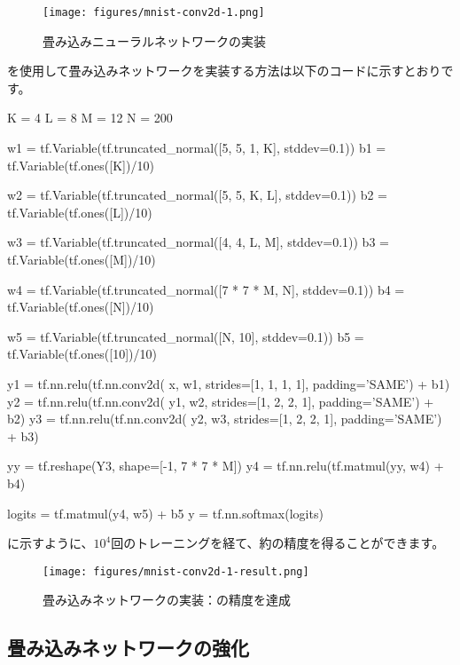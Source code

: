 \begin{content}
\begin{content}
\begin{figure}[H]
\centering
\texttt{[image: figures/mnist-conv2d-1.png]}
\caption{畳み込みニューラルネットワークの実装}
 \label{fig:mnist-conv2d-1}
\end{figure}

\tf{}を使用して畳み込みネットワークを実装する方法は以下のコードに示すとおりです。

\begin{leftbar}
\begin{python}
K = 4 
L = 8
M = 12
N = 200

w1 = tf.Variable(tf.truncated_normal([5, 5, 1, K], stddev=0.1))
b1 = tf.Variable(tf.ones([K])/10)

w2 = tf.Variable(tf.truncated_normal([5, 5, K, L], stddev=0.1))
b2 = tf.Variable(tf.ones([L])/10)

w3 = tf.Variable(tf.truncated_normal([4, 4, L, M], stddev=0.1))
b3 = tf.Variable(tf.ones([M])/10)

w4 = tf.Variable(tf.truncated_normal([7 * 7 * M, N], stddev=0.1))
b4 = tf.Variable(tf.ones([N])/10)

w5 = tf.Variable(tf.truncated_normal([N, 10], stddev=0.1))
b5 = tf.Variable(tf.ones([10])/10)

y1 = tf.nn.relu(tf.nn.conv2d(
       x,  w1, strides=[1, 1, 1, 1], padding='SAME') + b1)
y2 = tf.nn.relu(tf.nn.conv2d(
       y1, w2, strides=[1, 2, 2, 1], padding='SAME') + b2)
y3 = tf.nn.relu(tf.nn.conv2d(
       y2, w3, strides=[1, 2, 2, 1], padding='SAME') + b3)

yy = tf.reshape(Y3, shape=[-1, 7 * 7 * M])
y4 = tf.nn.relu(tf.matmul(yy, w4) + b4)

logits = tf.matmul(y4, w5) + b5
y = tf.nn.softmax(logits)
\end{python}
\end{leftbar}

に示すように、$10^4$回のトレーニングを経て、約の精度を得ることができます。

\begin{figure}[H]
\centering
\texttt{[image: figures/mnist-conv2d-1-result.png]}
\caption{畳み込みネットワークの実装：の精度を達成}
 \label{fig:mnist-conv2d-1-result}
\end{figure}

\subsection{畳み込みネットワークの強化}


\end{content}
\end{content}

